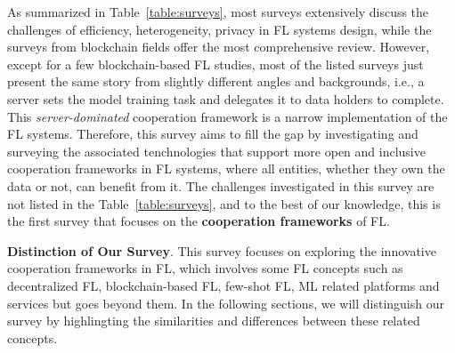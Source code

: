As summarized in Table~\ref{table:surveys}, most surveys extensively discuss the challenges of efficiency, heterogeneity, privacy in FL systems design, while the surveys from blockchain fields offer the most comprehensive review.
However, except for a few blockchain-based FL studies, most of the listed surveys just present the same story from slightly different angles and backgrounds, i.e., a server sets the model training task and delegates it to data holders to complete. 
This \textit{server-dominated} cooperation framework is a narrow implementation of the FL systems.
Therefore, this survey aims to fill the gap by investigating and surveying the associated tenchnologies that support more open and inclusive cooperation frameworks in FL systems, where all entities, whether they own the data or not, can benefit from it. 
The challenges investigated in this survey are not listed in the Table~\ref{table:surveys}, and to the best of our knowledge, this is the first survey that focuses on the \textbf{cooperation frameworks} of FL.

\textbf{Distinction of Our Survey}.
This survey focuses on exploring the innovative cooperation frameworks in FL, which involves some FL concepts such as decentralized FL, blockchain-based FL, few-shot FL, ML related platforms and services but goes beyond them.
In the following sections, we will distinguish our survey by highlingting the similarities and differences between these related concepts.


